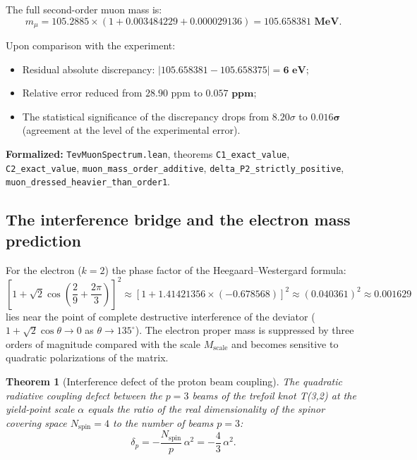 \documentclass[11pt,a4paper]{article}
\newtheorem{theorem}{Theorem}
\theoremstyle{definition}
\theoremstyle{remark}
\begin{document}
The full second-order muon mass is:
\begin{equation}
m_\mu = 105.2885 \times \left(1 + 0.003484229 + 0.000029136\right) = \mathbf{105.658381 \text{ MeV}}.
\end{equation}

Upon comparison with the experiment:
\begin{itemize}
    \item Residual absolute discrepancy: $|105.658381 - 105.658375| = \mathbf{6\text{ eV}}$;
    \item Relative error reduced from $28.90\text{ ppm}$ to $\mathbf{0.057\text{ ppm}}$;
    \item The statistical significance of the discrepancy drops from $8.20\sigma$ to $\mathbf{0.016\sigma}$ (agreement at the level of the experimental error).
\end{itemize}

\noindent\small\textbf{Formalized:} \texttt{TevMuonSpectrum.lean}, theorems \texttt{C1\_exact\_value}, \texttt{C2\_exact\_value}, \texttt{muon\_mass\_order\_additive}, \texttt{delta\_P2\_strictly\_positive}, \texttt{muon\_dressed\_heavier\_than\_order1}.

\subsection{The interference bridge and the electron mass prediction}

For the electron ($k=2$) the phase factor of the Heegaard--Westergard formula:
\begin{equation}
	\left[ 1 + \sqrt{2}\cos\left(\frac{2}{9} + \frac{2\pi}{3}\right) \right]^2 \approx \left[ 1 + 1.41421356 \times (-0.678568) \right]^2 \approx (0.040361)^2 \approx 0.001629
\end{equation}
lies near the point of complete destructive interference of the deviator ($1 + \sqrt{2}\cos\theta \to 0$ as $\theta \to 135^\circ$). The electron proper mass is suppressed by three orders of magnitude compared with the scale $M_{\mathrm{scale}}$ and becomes sensitive to quadratic polarizations of the matrix.
	
\begin{theorem}[Interference defect of the proton beam coupling]
\label{thm:proton_interference_defect}
The quadratic radiative coupling defect between the $p=3$ beams of the trefoil knot T(3,2) at the yield-point scale $\alpha$ equals the ratio of the real dimensionality of the spinor covering space $N_{\mathrm{spin}} = 4$ to the number of beams $p=3$:
\begin{equation}
	\delta_p = -\frac{N_{\mathrm{spin}}}{p} \, \alpha^2 = -\frac{4}{3} \, \alpha^2.
	\label{eq:defect_exact}
\end{equation}
\end{theorem}
\end{document}
